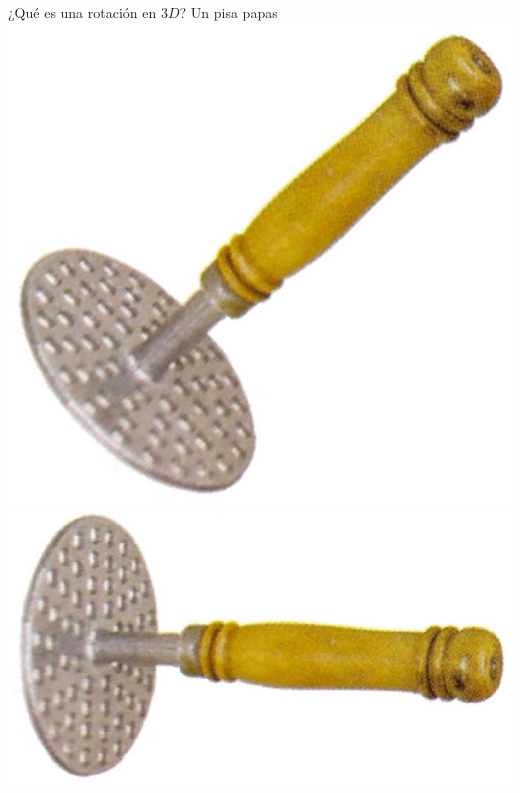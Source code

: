 \documentclass[10pt]{beamer}
\def\R{\mathbb{R}}
\begin{document}
\begin{frame}{¿Qué es una rotación en $3D$? Un pisa papas}
	\includegraphics[scale=0.2]{pisapapas_45.png}
	\includegraphics[scale=0.2]{pisapapas_180.png}
	
	
\end{frame}
\end{document}
